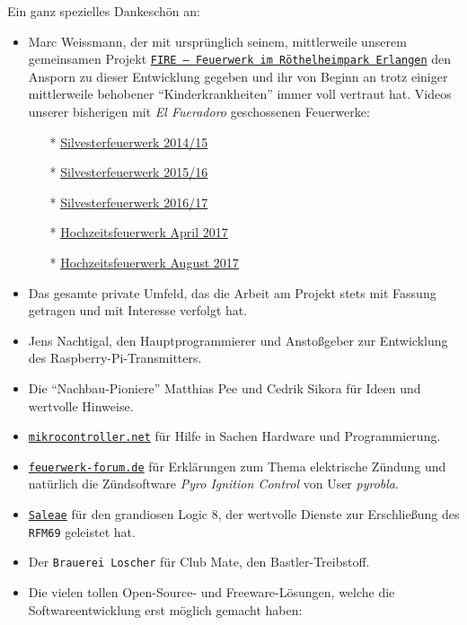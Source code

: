\documentclass[paper=a4, parskip, numbers=noenddot, toc=listof, headsepline]{scrbook}
\newcommand{\pic}{\emph{Pyro Ignition Control}}
\newcommand{\anlage}{\emph{El Fueradoro}}
\begin{document}
			Ein ganz spezielles Dankeschön an:
			\begin{itemize}
				\item Marc Weissmann, der mit ursprünglich seinem, mittlerweile unserem gemeinsamen Projekt \href{http://www.facebook.com/FIREErlangen}{\texttt{FIRE~-- Feuerwerk im Röthel\-heim\-park Er\-langen}} den Ansporn zu dieser Entwicklung gegeben und ihr von Beginn an trotz einiger mittlerweile behobener \enquote{Kinderkrankheiten} immer voll vertraut hat. Videos unserer bisherigen mit {\anlage} geschossenen Feuerwerke:
				      \begin{itemize}
					      \item[*] \underline{\href{https://vimeo.com/116115628}{Silvesterfeuerwerk 2014/15}}
					      \item[*] \underline{\href{https://vimeo.com/150594996}{Silvesterfeuerwerk 2015/16}}
					      \item[*] \underline{\href{https://vimeo.com/198168273}{Silvesterfeuerwerk 2016/17}}
					      \item[*] \underline{\href{https://www.youtube.com/watch?v=uPTW1dpsVoU}{Hochzeitsfeuerwerk April 2017}}
					      \item[*] \underline{\href{https://www.youtube.com/watch?v=q-nfOxinUgU}{Hochzeitsfeuerwerk August 2017}}
				      \end{itemize}
				\item Das gesamte private Umfeld, das die Arbeit am Projekt stets mit Fassung getragen und mit Interesse verfolgt hat.
				\item Jens Nachtigal, den Hauptprogrammierer und Anstoßgeber zur Entwicklung des Raspberry-Pi-Transmitters.
				\item Die \enquote{Nachbau-Pioniere} Matthias Pee und Cedrik Sikora für Ideen und wertvolle Hinweise.
				\item \href{http://www.mikrocontroller.net}{\texttt{mikrocontroller.net}} für Hilfe in Sachen Hardware und Programmierung.
				\item \href{http://www.feuerwerk-forum.de}{\texttt{feuerwerk-forum.de}} für Erklärungen zum Thema elektrische Zündung und natürlich die Zündsoftware {\pic} von User \emph{pyrobla}.
				\item \href{http://www.saleae.com}{\texttt{Saleae}} für den grandiosen Logic 8, der wertvolle Dienste zur Erschließung des \texttt{RFM69} geleistet hat.
				\item Der \texttt{Brauerei Loscher} für Club Mate, den Bastler-Treibstoff.
				\item Die vielen tollen Open-Source- und Freeware-Lösungen, welche die Softwareentwicklung erst möglich gemacht haben:

\end{itemize}
\end{document}
